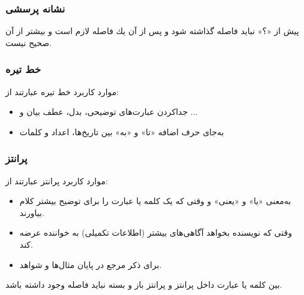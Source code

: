 \subsubsection{نشانه پرسشی}
پیش از «؟» نباید فاصله گذاشته شود و پس از آن یك فاصله لازم است و بیشتر از آن صحیح نیست. 
\subsubsection{خط تیره}
موارد كاربرد خط تیره عبارتند از:
\begin{itemize}
	\item 
جدا‌كردن عبارت‌های توضیحی، بدل، عطف بیان و ...
	\item 
به‌جای حرف اضافه «تا» و «به» بین تاریخ‌ها، اعداد و كلمات
\end{itemize}
\subsubsection{پرانتز }
موارد كاربرد پرانتز عبارتند از:
\begin{itemize}
\item 
به‌معنی «یا» و «یعنی» و وقتی كه یک كلمه یا عبارت را برای توضیح بیشتر كلام بیاورند.	
\item
وقتی كه نویسنده بخواهد آگاهی‌های بیشتر (اطلاعات تكمیلی) به خواننده عرضه كند.		
\item
		برای ذكر مرجع در پایان مثال‌ها و شواهد.	
\end{itemize}	
\begin{example}
	بین کلمه یا عبارت داخل پرانتز و پرانتز باز و بسته نباید فاصله وجود داشته باشد.
\end{example}

